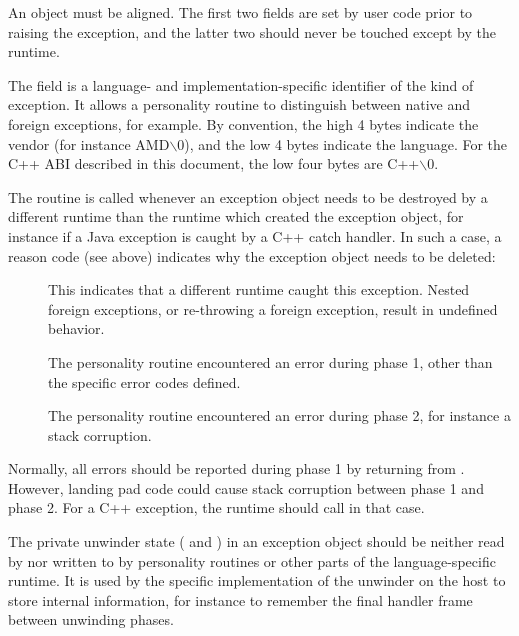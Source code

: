 An  object must be \eightbyte aligned.  The first
two fields are set by user code prior to raising the exception, and the
latter two should never be touched except by the runtime.

The  field is a language- and implementation-specific
identifier of the kind of exception. It allows a personality routine
to distinguish between native and foreign exceptions, for example.
By convention, the high 4 bytes indicate the vendor (for instance
AMD$\backslash$0), and the low 4 bytes indicate the language.  For the C++
ABI described in this document, the low four bytes are C++$\backslash$0.

The  routine is called whenever an exception object
needs to be destroyed by a different runtime than the runtime
which created the exception object, for instance if a Java exception
is caught by a C++ catch handler. In such a case, a reason code (see
above) indicates why the exception object needs to be deleted:

\begin{description}
\item[] This indicates that a
     different runtime caught this exception. Nested foreign exceptions,
     or re-throwing a foreign exception, result in undefined behavior.

\item[] The personality routine encountered
     an error during phase 1, other than the specific error codes defined.

\item[] The personality routine
  encountered an error during phase 2, for instance a stack corruption.
\end{description}

Normally, all errors should be reported during phase 1 by returning
from . However, landing pad code could cause
stack corruption between phase 1 and phase 2. For a C++ exception,
the runtime should call  in that case.

The private unwinder state ( and ) in an exception
object should be neither read by nor written to by personality routines or
other parts of the language-specific runtime.  It is used by the specific
implementation of the unwinder on the host to store internal information,
for instance to remember the final handler frame between unwinding phases.

